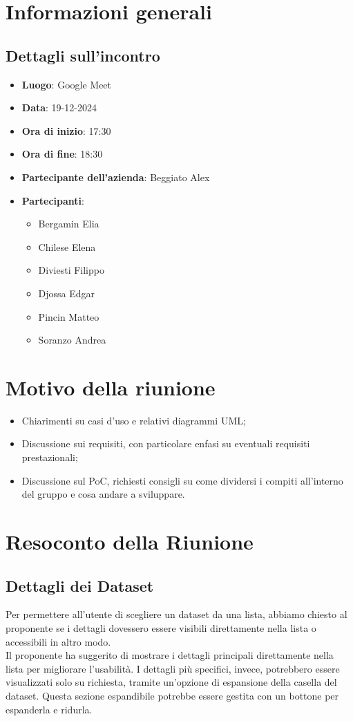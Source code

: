 \section{Informazioni generali}
\subsection{Dettagli sull'incontro}
\begin{itemize}
    \item \textbf{Luogo}: Google Meet
    \item \textbf{Data}: 19-12-2024
    \item \textbf{Ora di inizio}: 17:30
    \item \textbf{Ora di fine}: 18:30
    \item \textbf{Partecipante dell'azienda}: Beggiato Alex
    \item \textbf{Partecipanti}:
    \begin{itemize}
        \item Bergamin Elia
        \item Chilese Elena
        \item Diviesti Filippo
        \item Djossa Edgar
        \item Pincin Matteo 
        \item Soranzo Andrea  
    \end{itemize}
\end{itemize}

\section{Motivo della riunione}
\begin{itemize}
    \item Chiarimenti su casi d'uso e relativi diagrammi UML;
    \item Discussione sui requisiti, con particolare enfasi su eventuali requisiti prestazionali;
    \item Discussione sul PoC, richiesti consigli su come dividersi i compiti all'interno del gruppo e cosa andare a sviluppare.
\end{itemize}

\section{Resoconto della Riunione}
\subsection{Dettagli dei Dataset}
Per permettere all'utente di scegliere un dataset da una lista, abbiamo chiesto al proponente se i dettagli dovessero essere visibili direttamente nella lista o accessibili in altro modo. \\
Il proponente ha suggerito di mostrare i dettagli principali direttamente nella lista per migliorare l'usabilità. 
I dettagli più specifici, invece, potrebbero essere visualizzati solo su richiesta, tramite un'opzione di espansione della casella del dataset. 
Questa sezione espandibile potrebbe essere gestita con un bottone per espanderla e ridurla.

